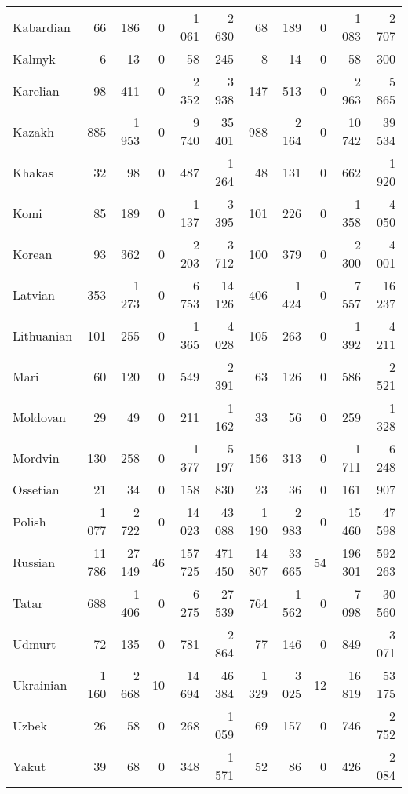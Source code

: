 \begin{table}[!h]
\begin{tabular}{lrrrrrrrrrr}
Kabardian & 66 & 186 & 0 & 1 061 & 2 630 & 68 & 189 & 0 & 1 083 & 2 707\\
Kalmyk & 6 & 13 & 0 & 58 & 245 & 8 & 14 & 0 & 58 & 300\\
Karelian & 98 & 411 & 0 & 2 352 & 3 938 & 147 & 513 & 0 & 2 963 & 5 865\\
Kazakh & 885 & 1 953 & 0 & 9 740 & 35 401 & 988 & 2 164 & 0 & 10 742 & 39 534\\
Khakas & 32 & 98 & 0 & 487 & 1 264 & 48 & 131 & 0 & 662 & 1 920\\
Komi & 85 & 189 & 0 & 1 137 & 3 395 & 101 & 226 & 0 & 1 358 & 4 050\\
Korean & 93 & 362 & 0 & 2 203 & 3 712 & 100 & 379 & 0 & 2 300 & 4 001\\
Latvian & 353 & 1 273 & 0 & 6 753 & 14 126 & 406 & 1 424 & 0 & 7 557 & 16 237\\
Lithuanian & 101 & 255 & 0 & 1 365 & 4 028 & 105 & 263 & 0 & 1 392 & 4 211\\
Mari & 60 & 120 & 0 & 549 & 2 391 & 63 & 126 & 0 & 586 & 2 521\\
Moldovan & 29 & 49 & 0 & 211 & 1 162 & 33 & 56 & 0 & 259 & 1 328\\
Mordvin & 130 & 258 & 0 & 1 377 & 5 197 & 156 & 313 & 0 & 1 711 & 6 248\\
Ossetian & 21 & 34 & 0 & 158 & 830 & 23 & 36 & 0 & 161 & 907\\
Polish & 1 077 & 2 722 & 0 & 14 023 & 43 088 & 1 190 & 2 983 & 0 & 15 460 & 47 598\\
Russian & 11 786 & 27 149 & 46 & 157 725 & 471 450 & 14 807 & 33 665 & 54 & 196 301 & 592 263\\
Tatar & 688 & 1 406 & 0 & 6 275 & 27 539 & 764 & 1 562 & 0 & 7 098 & 30 560\\
Udmurt & 72 & 135 & 0 & 781 & 2 864 & 77 & 146 & 0 & 849 & 3 071\\
Ukrainian & 1 160 & 2 668 & 10 & 14 694 & 46 384 & 1 329 & 3 025 & 12 & 16 819 & 53 175\\
Uzbek & 26 & 58 & 0 & 268 & 1 059 & 69 & 157 & 0 & 746 & 2 752\\
Yakut & 39 & 68 & 0 & 348 & 1 571 & 52 & 86 & 0 & 426 & 2 084\\
\bottomrule
\end{tabular}
\end{table}